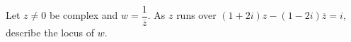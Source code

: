 Let $z\ne0$ be complex and $w=\dfrac{1}{\overline z}$. As $z$ runs over $(1+2i)z-(1-2i)\overline z=i$, describe the locus of $w$.
